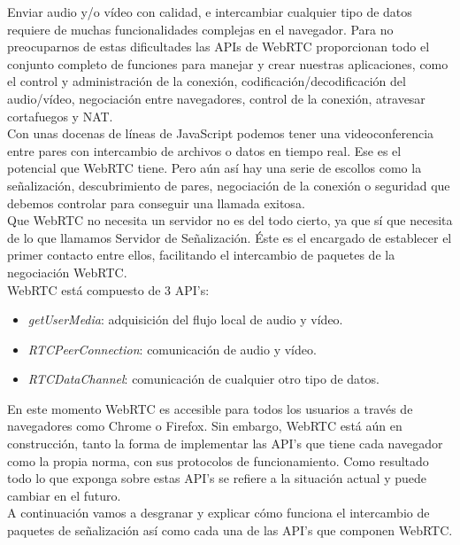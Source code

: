 Enviar audio y/o vídeo con calidad, e intercambiar cualquier tipo de datos requiere de muchas funcionalidades complejas en el navegador. Para no preocuparnos de estas dificultades las APIs de WebRTC proporcionan todo el conjunto completo de funciones para manejar y crear nuestras aplicaciones, como el control y administración de la conexión, codificación/decodificación del audio/vídeo, negociación entre navegadores, control de la conexión, atravesar cortafuegos y NAT.\\

Con unas docenas de líneas de JavaScript podemos tener una videoconferencia entre pares con intercambio de archivos o datos en tiempo real. Ese es el potencial que WebRTC tiene. Pero aún así hay una serie de escollos como la señalización, descubrimiento de pares, negociación de la conexión o seguridad que debemos controlar para conseguir una llamada exitosa.\\

Que WebRTC no necesita un servidor no es del todo cierto, ya que sí que necesita de lo que llamamos Servidor de Señalización. Éste es el encargado de establecer el primer contacto entre ellos, facilitando el intercambio de paquetes de la negociación WebRTC.\\

\noindent WebRTC está compuesto de 3 API's:

\begin{itemize}
\item \emph{getUserMedia}: adquisición del flujo local de audio y vídeo.
\item \emph{RTCPeerConnection}: comunicación de audio y vídeo.
\item \emph{RTCDataChannel}: comunicación de cualquier otro tipo de datos.
\end{itemize}

En este momento WebRTC es accesible para todos los usuarios a través de navegadores como Chrome o Firefox. Sin embargo, WebRTC está aún en construcción, tanto la forma de implementar las API's que tiene cada navegador como la propia norma, con sus protocolos de funcionamiento. Como resultado todo lo que exponga sobre estas API's se refiere a la situación actual y puede cambiar en el futuro.\\

A continuación vamos a desgranar y explicar cómo funciona el intercambio de paquetes de señalización así como cada una de las API's que componen WebRTC.\\

